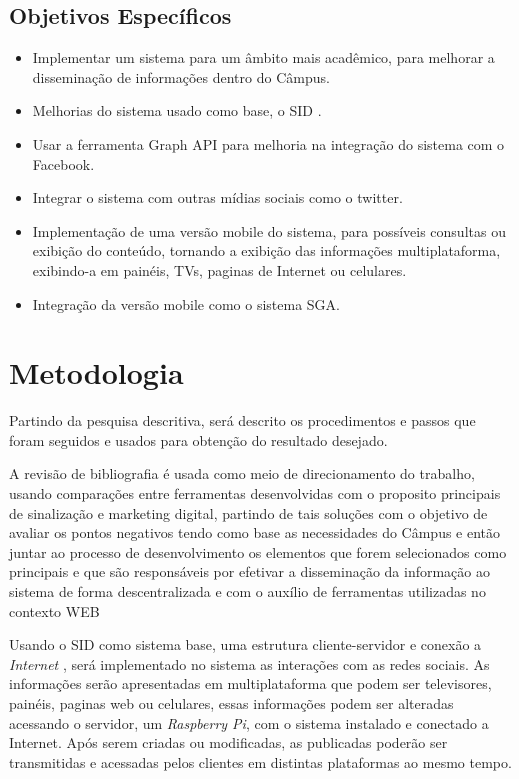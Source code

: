 \subsection{Objetivos Específicos}
	 \begin{itemize}
	\item Implementar um sistema para um âmbito mais acadêmico, para melhorar a disseminação de informações dentro do Câmpus.
	 	
	\item Melhorias do sistema usado como base, o SID \cite{sobrinho2017}.
	
	\item Usar a ferramenta Graph API para melhoria na integração do sistema com o Facebook.
	
	\item Integrar o sistema com outras mídias sociais como o twitter.
	
	\item Implementação de uma versão mobile do sistema, para possíveis consultas ou exibição do conteúdo, tornando a exibição das informações multiplataforma, exibindo-a em painéis, TVs, paginas de Internet ou celulares.
	
	\item  Integração da versão mobile como o sistema SGA.
	\end{itemize}
\section{Metodologia}
Partindo da pesquisa descritiva, será descrito os procedimentos e passos que foram seguidos e usados para obtenção do resultado desejado.
	
A revisão de bibliografia é usada como meio de direcionamento do trabalho, usando comparações entre ferramentas desenvolvidas com o proposito principais de sinalização e marketing digital, partindo de tais soluções com o objetivo de avaliar os pontos negativos tendo como base as necessidades do Câmpus e então juntar ao processo de desenvolvimento os elementos que forem selecionados como principais e que são responsáveis por efetivar a disseminação da informação ao sistema de forma descentralizada e com o auxílio de ferramentas utilizadas no contexto WEB
	 
Usando o SID como sistema base, uma estrutura cliente-servidor e conexão a \textit{Internet} , será implementado no sistema as interações com as redes sociais. As informações serão apresentadas em multiplataforma que podem ser televisores, painéis, paginas web ou celulares, essas informações podem ser alteradas acessando o servidor, um \textit{Raspberry Pi}, com o sistema instalado e conectado a Internet. Após serem criadas ou modificadas, as publicadas poderão ser transmitidas e acessadas pelos clientes em distintas plataformas ao mesmo tempo.
	
